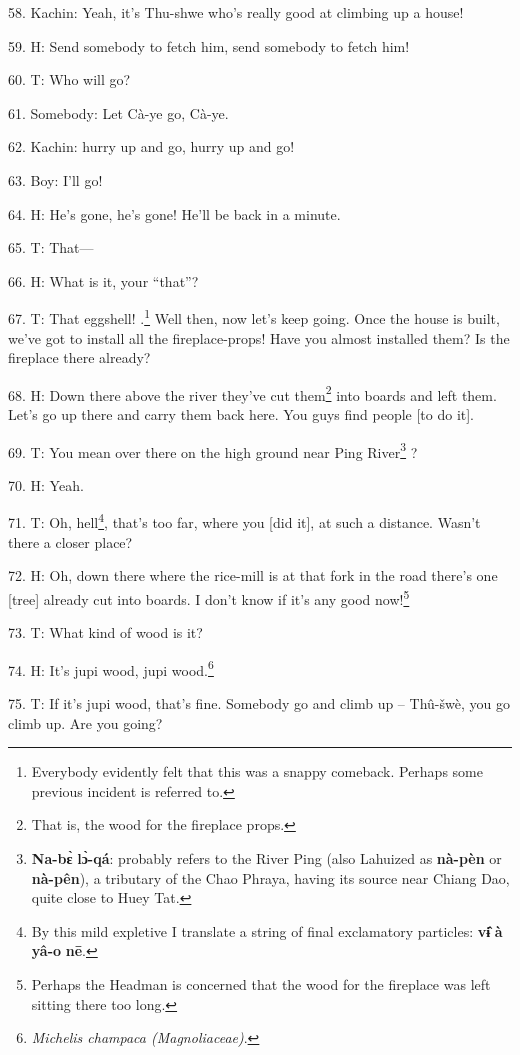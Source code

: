 58. Kachin: Yeah, it's Thu-shwe who's really good at climbing up a house!

59. H: Send somebody to fetch him, send somebody to fetch him!

60. T: Who will go?

61. Somebody: Let Cà-ye go, Cà-ye.

62. Kachin: hurry up and go, hurry up and go!

63. Boy: I'll go!

64. H: He's gone, he's gone! He'll be back in a minute.

65. T: That---

66. H: What is it, your ``that''?

67. T: That eggshell! .\footnote{Everybody evidently felt that this was a snappy comeback. Perhaps some previous incident is referred to.} Well then, now let's keep
going. Once the house is built, we've got to install all the fireplace-props!
Have you almost installed them? Is the fireplace there already?

68. H: Down there above the river they've cut them\footnote{That is, the wood for the fireplace props.} into boards and left them.
Let's go up there and carry them back here. You guys find people [to do it].

69. T: You mean over there on the high ground near Ping River\footnote{\textbf{Na-bɛ̀} \textbf{lɔ̀-qá}: probably refers to the River Ping (also Lahuized as \textbf{nà-pèn} or \textbf{nà-pên}), a tributary of the Chao Phraya, having its source near Chiang Dao, quite close to Huey Tat.} ?

70. H: Yeah.

71. T: Oh, hell\footnote{By this mild expletive I translate a string of final exclamatory particles: \textbf{vɨ̂} \textbf{à} \textbf{yâ-o} \textbf{nē}.}, that's too far, where you [did it], at such a distance. Wasn't
there a closer place?

72. H: Oh, down there where the rice-mill is at that fork in the road there's one
[tree] already cut into boards. I don't know if it's any good now!\footnote{Perhaps the Headman is concerned that the wood for the fireplace was left sitting there too long.}

73. T: What kind of wood is it?

74. H: It's jupi wood, jupi wood.\footnote{\textit{Michelis champaca (Magnoliaceae)}.}

75. T: If it's jupi wood, that's fine. Somebody go and climb up -- Thû-šwè,
you go climb up. Are you going?

